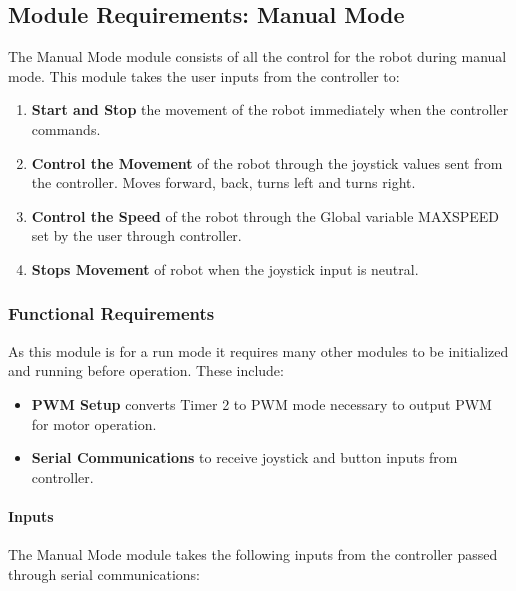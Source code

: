 \documentclass[MTRX3700report.tex]{subfiles}
\begin{document}
	
	\subsection{Module Requirements: Manual Mode}
	
	The Manual Mode module consists of all the control for the robot during manual mode. This module takes the user inputs from the controller to:
	
	\begin{enumerate}
		\item \textbf{Start and Stop} the movement of the robot immediately when the controller commands.
		\item \textbf{Control the Movement} of the robot through the joystick values sent from the controller. Moves forward, back, turns left and turns right.
		\item \textbf{Control the Speed} of the robot through the Global variable MAX\textunderscore SPEED set by the user through controller.
		\item \textbf{Stops Movement} of robot when the joystick input is neutral.	
	\end{enumerate} 
	
	\subsubsection{Functional Requirements}
	As this module is for a run mode it requires many other modules to be initialized and running before operation. These include:
	
	\begin{itemize}
		\item \textbf{PWM Setup} converts Timer 2 to PWM mode necessary to output PWM for motor operation.
		\item \textbf{Serial Communications} to receive joystick and button inputs from controller.
	\end{itemize} 
	
	
	\paragraph{Inputs}
	
	The Manual Mode module takes the following inputs from the controller passed through serial communications:
	
\end{document}
